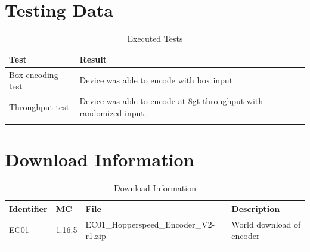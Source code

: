\documentclass[10pt]{datasheet}
\begin{document}
\section{Testing Data}
\begin{table}[h]
\caption{Executed Tests}
\begin{tabularx}{\textwidth}{l | X}
    \thickhline
    \textbf{Test} & \textbf{Result} \\
    \hline
    Box encoding test & Device was able to encode with box input \\
    \hline
    Throughput test & Device was able to encode at 8gt throughput with randomized input. \\
    \thickhline
\end{tabularx}
\end{table}

\section{Download Information}
\begin{table}[h]
    \caption{Download Information}
    \begin{tabularx}{\textwidth}{l | l | l | X}
        \thickhline
        \textbf{Identifier} & \textbf{MC} & \textbf{File} & \textbf{Description} \\
        \hline
        EC01 & 1.16.5 & EC01\_Hopperspeed\_Encoder\_V2-r1.zip & World download of encoder \\
        \hline
        \thickhline
    \end{tabularx}
\end{table}
\end{document}
